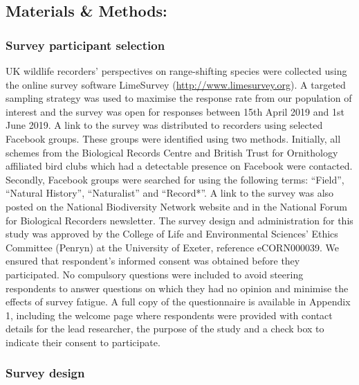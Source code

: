 \documentclass[
]{article}
\begin{document}
\hypertarget{materials-methods}{%
\subsection{Materials \& Methods:}\label{materials-methods}}

\hypertarget{survey-participant-selection}{%
\subsubsection{Survey participant
selection}\label{survey-participant-selection}}

UK wildlife recorders' perspectives on range-shifting species were
collected using the online survey software LimeSurvey
(\url{http://www.limesurvey.org}). A targeted sampling strategy was used
to maximise the response rate from our population of interest and the
survey was open for responses between 15th April 2019 and 1st June 2019.
A link to the survey was distributed to recorders using selected
Facebook groups. These groups were identified using two methods.
Initially, all schemes from the Biological Records Centre and British
Trust for Ornithology affiliated bird clubs which had a detectable
presence on Facebook were contacted. Secondly, Facebook groups were
searched for using the following terms: ``Field'', ``Natural History'',
``Naturalist'' and ``Record*''. A link to the survey was also posted on
the National Biodiversity Network website and in the National Forum for
Biological Recorders newsletter. The survey design and administration
for this study was approved by the College of Life and Environmental
Sciences' Ethics Committee (Penryn) at the University of Exeter,
reference eCORN000039. We ensured that respondent's informed consent was
obtained before they participated. No compulsory questions were included
to avoid steering respondents to answer questions on which they had no
opinion and minimise the effects of survey fatigue. A full copy of the
questionnaire is available in Appendix 1, including the welcome page
where respondents were provided with contact details for the lead
researcher, the purpose of the study and a check box to indicate their
consent to participate.

\hypertarget{survey-design}{%
\subsubsection{Survey design}\label{survey-design}}
\end{document}
